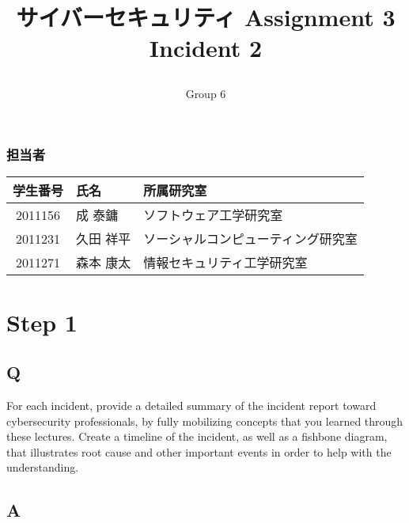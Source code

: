\documentclass[uplatex]{jsarticle}
\title{
    \vspace{-1.5cm}
    サイバーセキュリティ Assignment 3 \\
    Incident 2
    \author{Group 6}
}
\begin{document}
\maketitle

\subsubsection*{担当者}
\begin{table}[H]
    \begin{tabular}{|c|l|l|}
        \hline
        学生番号 & 氏名 & 所属研究室\\
        \hline\hline
        2011156 & 成 泰鏞 & ソフトウェア工学研究室\\
        \hline
        2011231 & 久田 祥平 & ソーシャルコンピューティング研究室\\
        \hline
        2011271 & 森本 康太 & 情報セキュリティ工学研究室\\
        \hline
    \end{tabular}
\end{table}

\section*{Step 1}
\subsection*{Q}
For each incident, provide a detailed summary of the incident report toward cybersecurity professionals, by fully mobilizing concepts that you learned through these lectures. Create a timeline of the incident, as well as a fishbone diagram, that illustrates root cause and other important events in order to help with the understanding.
\subsection*{A}
\end{document}
